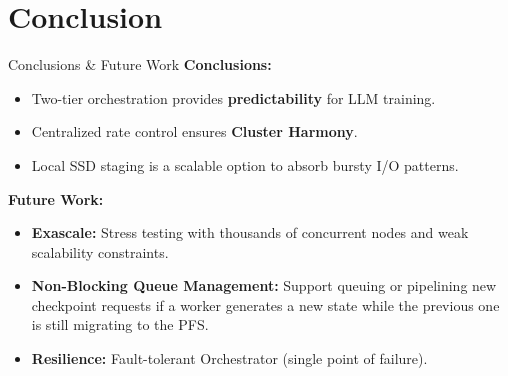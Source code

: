 \documentclass[handout]{beamer}
\begin{document}
\section{Conclusion}

\begin{frame}{Conclusions \& Future Work}
    \small
    \textbf{Conclusions:}
    \begin{itemize}
        \item Two-tier orchestration provides \textbf{predictability} for LLM training.
        \item Centralized rate control ensures \textbf{Cluster Harmony}.
        \item Local SSD staging is a scalable option to absorb bursty I/O patterns.
    \end{itemize}

    \vspace{0.5em}
    \textbf{Future Work:}
    \begin{itemize}
        \item \textbf{Exascale:} Stress testing with thousands of concurrent nodes and weak scalability constraints.
        \item \textbf{Non-Blocking Queue Management:} Support queuing or pipelining new checkpoint requests if a worker generates a new state while the previous one is still migrating to the PFS.
        \item \textbf{Resilience:} Fault-tolerant Orchestrator (single point of failure).
    \end{itemize}
\end{frame}

\frame{\titlepage}
\end{document}
